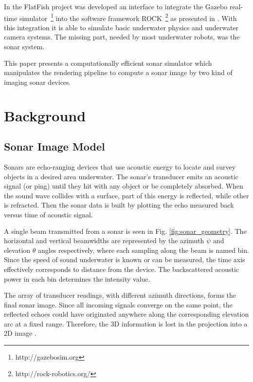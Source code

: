 \documentclass[final,5p,times]{elsarticle}
\begin{document}
In the FlatFish project \cite{albiez2015} was developed an interface to integrate the Gazebo real-time simulator~\footnote{http://gazebosim.org} into the software framework ROCK~\footnote{http://rock-robotics.org/} as presented in \cite{watanabe2015}. With this integration it is able to simulate basic underwater physics and underwater camera systems. The missing part, needed by most underwater robots, was the sonar system.

This paper presents a computationally efficient sonar simulator which manipulates the rendering pipeline to compute a sonar image by two kind of imaging sonar devices.


\section{Background}
\label{background}

\subsection{Sonar Image Model}
\label{sonar:model}

Sonars are echo-ranging devices that use acoustic energy to locate and survey objects in a desired area underwater. The sonar's transducer emits an acoustic signal (or ping) until they hit with any object or be completely absorbed. When the sound wave collides with a surface, part of this energy is reflected, while other is refracted. Then the sonar data is built by plotting the echo measured back versus time of acoustic signal.

A single beam transmitted from a sonar is seen in Fig. \ref{fig:sonar_geometry}. The horizontal and vertical beamwidths are represented by the azimuth $\psi$ and elevation $\theta$ angles respectively, where each sampling along the beam is named bin. Since the speed of sound underwater is known or can be measured, the time axis effectively corresponds to distance from the device. The backscattered acoustic power in each bin determines the intensity value.

The array of transducer readings, with different azimuth directions, forms the final sonar image. Since all incoming signals converge on the same point, the reflected echoes could have originated anywhere along the corresponding elevation arc at a fixed range. Therefore, the 3D information is lost in the projection into a 2D image \cite{huang2015}.
\end{document}
